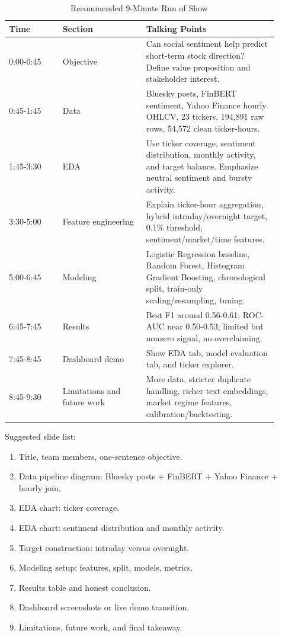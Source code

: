 \documentclass[11pt]{article}
\begin{document}
\begin{table}[H]
\centering
\caption{Recommended 9-Minute Run of Show}
\begin{tabular}{p{0.18\linewidth}p{0.28\linewidth}p{0.44\linewidth}}
\toprule
Time & Section & Talking Points \\
\midrule
0:00-0:45 & Objective & Can social sentiment help predict short-term stock direction? Define value proposition and stakeholder interest. \\
0:45-1:45 & Data & Bluesky posts, FinBERT sentiment, Yahoo Finance hourly OHLCV, 23 tickers, 194,891 raw rows, 54,572 clean ticker-hours. \\
1:45-3:30 & EDA & Use ticker coverage, sentiment distribution, monthly activity, and target balance. Emphasize neutral sentiment and bursty activity. \\
3:30-5:00 & Feature engineering & Explain ticker-hour aggregation, hybrid intraday/overnight target, 0.1\% threshold, sentiment/market/time features. \\
5:00-6:45 & Modeling & Logistic Regression baseline, Random Forest, Histogram Gradient Boosting, chronological split, train-only scaling/resampling, tuning. \\
6:45-7:45 & Results & Best F1 around 0.56-0.61; ROC-AUC near 0.50-0.53; limited but nonzero signal, no overclaiming. \\
7:45-8:45 & Dashboard demo & Show EDA tab, model evaluation tab, and ticker explorer. \\
8:45-9:30 & Limitations and future work & More data, stricter duplicate handling, richer text embeddings, market regime features, calibration/backtesting. \\
\bottomrule
\end{tabular}
\end{table}

Suggested slide list:

\begin{enumerate}
    \item Title, team members, one-sentence objective.
    \item Data pipeline diagram: Bluesky posts + FinBERT + Yahoo Finance + hourly join.
    \item EDA chart: ticker coverage.
    \item EDA chart: sentiment distribution and monthly activity.
    \item Target construction: intraday versus overnight.
    \item Modeling setup: features, split, models, metrics.
    \item Results table and honest conclusion.
    \item Dashboard screenshots or live demo transition.
    \item Limitations, future work, and final takeaway.
\end{enumerate}
\end{document}
